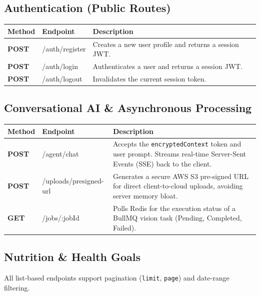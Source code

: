 \documentclass[11pt,a4paper,twoside]{article}
\begin{document}
\subsection{Authentication (Public Routes)}
\begin{table}[H]
\centering
\begin{tabularx}{\textwidth}{>{\bfseries\sffamily}p{16mm} >{\ttfamily}p{39mm} Y}
\toprule
Method & Endpoint & Description \\
\midrule
POST & /auth/register & Creates a new user profile and returns a session JWT. \\
POST & /auth/login & Authenticates a user and returns a session JWT. \\
POST & /auth/logout & Invalidates the current session token. \\
\bottomrule
\end{tabularx}
\end{table}

\subsection{Conversational AI \& Asynchronous Processing}
\begin{table}[H]
\centering
\begin{tabularx}{\textwidth}{>{\bfseries\sffamily}p{16mm} >{\ttfamily\small}p{53mm} Y}
\toprule
Method & Endpoint & Description \\
\midrule
POST & /agent/chat & Accepts the \texttt{encryptedContext} token and user prompt. Streams real-time Server-Sent Events (SSE) back to the client. \\
POST & /uploads/presigned-url & Generates a secure AWS S3 pre-signed URL for direct client-to-cloud uploads, avoiding server memory bloat. \\
GET & /jobs/:jobId & Polls Redis for the execution status of a BullMQ vision task (Pending, Completed, Failed). \\
\bottomrule
\end{tabularx}
\end{table}

\subsection{Nutrition \& Health Goals}
All list-based endpoints support pagination (\texttt{limit}, \texttt{page}) and date-range filtering.
\end{document}
